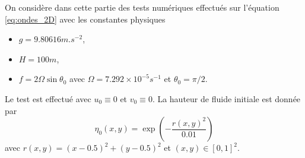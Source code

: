 On considère dans cette partie des tests numériques effectués sur l'équation \eqref{eq:ondes_2D} avec les constantes physiques
\begin{itemize}
\item $g = 9.80616 m.s^{-2}$,
\item $H=100 m$,
\item $f = 2 \Omega \sin \theta_0$ avec $\Omega = 7.292 \times 10^{-5} s^{-1}$ et $\theta_0 = \pi/2$.
\end{itemize}
Le test est effectué avec $u_0 \equiv 0$ et $v_0 \equiv 0$. La hauteur de fluide initiale est donnée par
\begin{equation}
\eta_0(x,y) = \exp \left( - \dfrac{r(x,y)^2}{0.01} \right)
\label{eq:waves_test1}
\end{equation}
avec $r(x,y) = (x-0.5)^2+(y-0.5)^2$ et $(x,y) \in [0,1]^2$.

